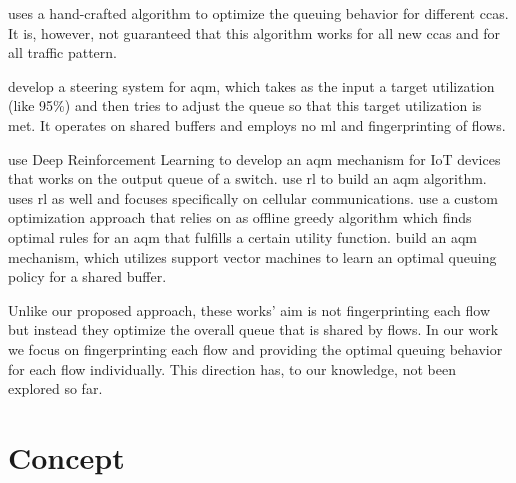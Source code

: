 \documentclass[conference]{IEEEtran}
\begin{document}
\cite{bachl_cocoa_2019} uses a hand-crafted algorithm to optimize the queuing behavior for different \glspl{cca}. It is, however, not guaranteed that this algorithm works for all new \glspl{cca} and for all traffic pattern. 

\cite{bless_policy-oriented_2018} develop a steering system for \gls{aqm}, which takes as the input a target utilization (like 95\%) and then tries to adjust the queue so that this target utilization is met. It operates on shared buffers and employs no \gls{ml} and fingerprinting of flows. 

\cite{kim_deep_2019} use Deep Reinforcement Learning to develop an \gls{aqm} mechanism for IoT devices that works on the output queue of a switch.  \cite{bouacida_practical_2019,bisoy_design_2017} use \gls{rl} to build an \gls{aqm} algorithm. \cite{vucevic_reinforcement_2007} uses \gls{rl} as well and focuses specifically on cellular communications. \cite{lin_kemy_2015} use a custom optimization approach that relies on as offline greedy algorithm which finds optimal rules for an \gls{aqm} that fulfills a certain utility function. \cite{shah_sam_2016} build an \gls{aqm} mechanism, which utilizes support vector machines to learn an optimal queuing policy for a shared buffer. 

Unlike our proposed approach, these works' aim is not fingerprinting each flow but instead they optimize the overall queue that is shared by flows. In our work we focus on fingerprinting each flow and providing the optimal queuing behavior for each flow individually. This direction has, to our knowledge, not been explored so far. 

\section{Concept}
\label{sec:concept}
\end{document}
